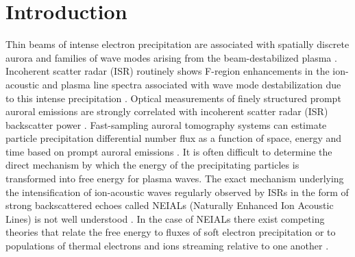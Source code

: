 \graphicspath{{Fusion/}}

\section{Introduction}\label{sec:intro}
Thin beams of intense electron precipitation are associated with spatially discrete aurora and families of wave modes arising from the beam-destabilized plasma \citep{akbari2015}.
Incoherent scatter radar (ISR) routinely shows F-region enhancements in the ion-acoustic and plasma line spectra associated with wave mode destabilization due to this intense precipitation \citep{schlatter2014}.
Optical measurements of finely structured prompt auroral emissions are strongly correlated with incoherent scatter radar (ISR) backscatter power \citep{sullivan2008,michell2009,michell2014}.
Fast-sampling auroral tomography systems can estimate particle precipitation differential number flux as a function of space, energy and time based on prompt auroral emissions \citep{hirsch2016}.
It is often difficult to determine the direct mechanism by which the energy of the precipitating particles is transformed into free energy for plasma waves.
The exact mechanism underlying the intensification of ion-acoustic waves regularly observed by ISRs in the form of strong backscattered echoes called NEIALs (Naturally Enhanced Ion Acoustic Lines) is not well understood \citep{michell2014}.
In the case of NEIALs there exist competing theories that relate the free energy to fluxes of soft electron precipitation \citep{akbari2014} or to populations of thermal electrons and ions streaming relative to one another \citep{akbari2012}.

